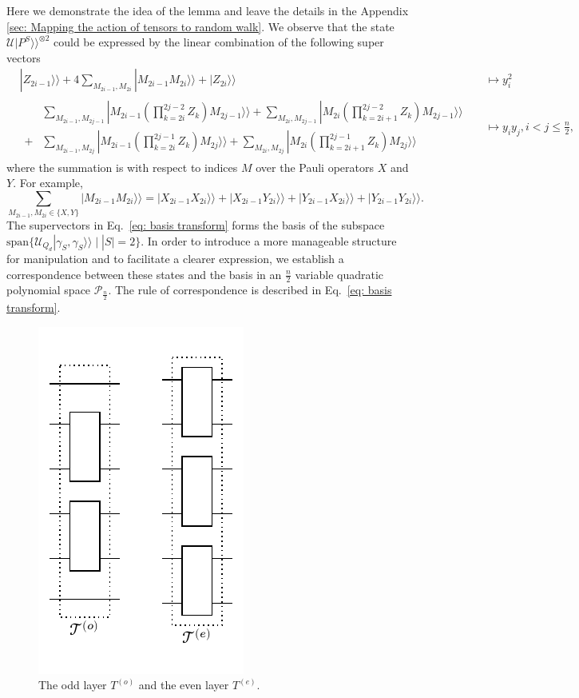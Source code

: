 \documentclass{article}
\newcommand{\supket}[1]{|#1 \rangle\rangle}
\begin{document}
Here we demonstrate the idea of the lemma and leave the details in the Appendix \ref{sec: Mapping the action of tensors to random walk}. We observe that the state $\mathcal{U}\supket{P^S}^{\otimes 2}$ could be expressed by the linear combination of the following super vectors
\begin{equation}
\begin{aligned}
    & \supket{Z_{2i-1}} + 4\sum_{M_{2i-1}, M_{2i}} \supket{M_{2i-1}M_{2i}} +  \supket{Z_{2i}}  & & \longmapsto y_i^2\\
    & 
    \begin{aligned}
        &\sum_{M_{2i-1}, M_{2j-1}}\supket{M_{2i-1}(\prod_{k = 2i}^{2j-2} Z_k) M_{2j-1}} + \sum_{M_{2i}, M_{2j-1}}\supket{M_{2i}(\prod_{k = 2i+1}^{2j-2} Z_k) M_{2j-1}} \\
        +&\sum_{M_{2i-1}, M_{2j}}\supket{M_{2i-1}(\prod_{k = 2i}^{2j-1} Z_k) M_{2j}} + \sum_{M_{2i}, M_{2j}}\supket{M_{2i}(\prod_{k = 2i+1}^{2j-1} Z_k) M_{2j}}
    \end{aligned}
      & & \longmapsto y_i y_j, i< j\leq \frac{n}{2} ,
\end{aligned}
\label{eq: basis transform}
\end{equation}
where the summation is with respect to indices $M$ over the Pauli operators $X$ and $Y$. For example,
\begin{equation*}
    \sum_{M_{2i-1}, M_{2i}\in \{X,Y\}} \supket{M_{2i-1}M_{2i}} = \supket{X_{2i-1}X_{2i}} + \supket{X_{2i-1}Y_{2i}} + \supket{Y_{2i-1}X_{2i}} + \supket{Y_{2i-1}Y_{2i}}.
\end{equation*}
The supervectors in Eq.~\eqref{eq: basis transform} forms the basis of the subspace $\mathrm{span}\{\mathcal{U}_{Q_d} \supket{\gamma_S, \gamma_S}\mid |S| = 2\}$. In order to introduce a more manageable structure for manipulation and to facilitate a clearer expression, we establish a correspondence between these states and the basis in an $\frac{n}{2}$ variable quadratic polynomial space $\mathcal{P}_\frac{n}{2}$. The rule of correspondence is described in Eq.~\eqref{eq: basis transform}. 

\begin{figure}
    \centering
    \includegraphics[width=0.22\linewidth]{figures/appendix/Todd_Teven.pdf}
    \caption{The odd layer $T^{(o)}$ and the even layer $T^{(e)}$. }
    \label{fig: odd layer and even layer}
\end{figure}
\end{document}
